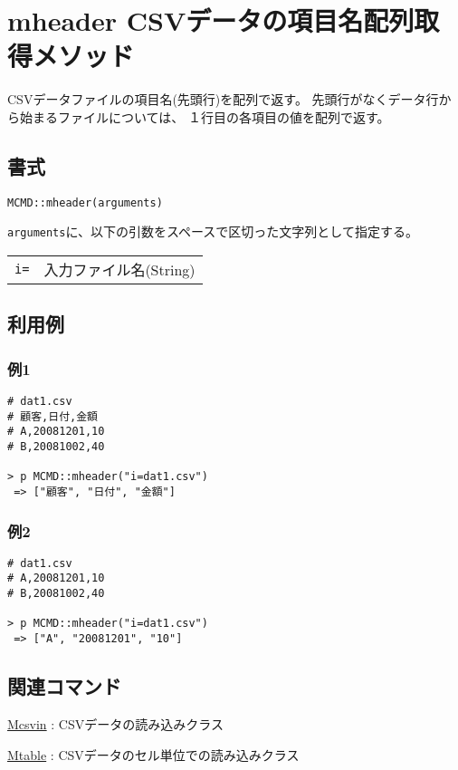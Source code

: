 
%

\section{mheader CSVデータの項目名配列取得メソッド\label{sect:mheaderRB}}
CSVデータファイルの項目名(先頭行)を配列で返す。
先頭行がなくデータ行から始まるファイルについては、
１行目の各項目の値を配列で返す。

\subsection{書式}

{\large
\begin{verbatim}
MCMD::mheader(arguments)
\end{verbatim}
} 

\verb|arguments|に、以下の引数をスペースで区切った文字列として指定する。
\begin{table}[htbp]
\begin{tabular}{ll}
\verb|i=|    & 入力ファイル名(String)\\
\end{tabular} 
\end{table} 

\subsection{利用例}
\subsubsection*{例1}

\begin{Verbatim}[baselinestretch=0.7,frame=single]
# dat1.csv
# 顧客,日付,金額
# A,20081201,10
# B,20081002,40

> p MCMD::mheader("i=dat1.csv")
 => ["顧客", "日付", "金額"] 
\end{Verbatim}

\subsubsection*{例2}

\begin{Verbatim}[baselinestretch=0.7,frame=single]
# dat1.csv
# A,20081201,10
# B,20081002,40

> p MCMD::mheader("i=dat1.csv")
 => ["A", "20081201", "10"] 
\end{Verbatim}

\subsection{関連コマンド}
\hyperref[sect:mcsvinRB]{Mcsvin} : CSVデータの読み込みクラス

\hyperref[sect:mtableRB]{Mtable} : CSVデータのセル単位での読み込みクラス

%

